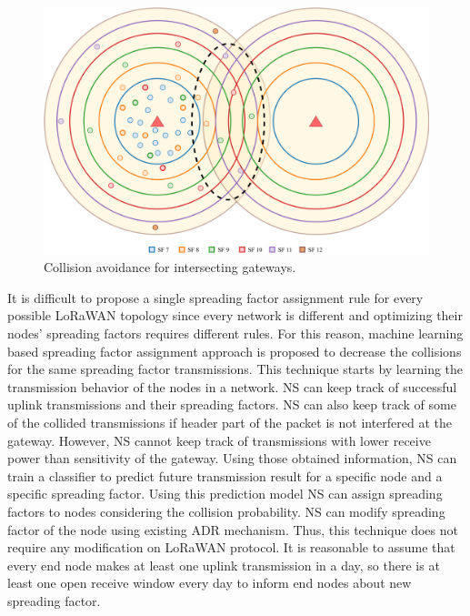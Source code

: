 \begin{figure}
\centering
\includegraphics[width=\linewidth]{fig/lora_multi_gw_collision_fix.png}
\vspace*{4mm}
\caption{Collision avoidance for intersecting gateways.}
\label{fig:collision_solution_multi_gw}
\end{figure}

It is difficult to propose a single spreading factor assignment rule for every possible LoRaWAN topology since every network is different and optimizing their nodes' spreading factors requires different rules. For this reason, machine learning based spreading factor assignment approach is proposed to decrease the collisions for the same spreading factor transmissions. This technique starts by learning the transmission behavior of the nodes in a network. NS can keep track of successful uplink transmissions and their spreading factors. NS can also keep track of some of the collided transmissions if header part of the packet is not interfered at the gateway. However, NS cannot keep track of transmissions with lower receive power than sensitivity of the gateway. Using those obtained information, NS can train a classifier to predict future transmission result for a specific node and a specific spreading factor. Using this prediction model NS can assign spreading factors to nodes considering the collision probability. NS can modify spreading factor of the node using existing ADR mechanism. Thus, this technique does not require any modification on LoRaWAN protocol. It is reasonable to assume that every end node makes at least one uplink transmission in a day, so there is at least one open receive window every day to inform end nodes about new spreading factor.

